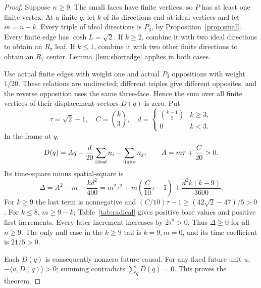 \documentclass[11pt]{article}
\theoremstyle{definition}\newtheorem{definition}[theorem]{Definition}
\theoremstyle{remark}\newtheorem{remark}[theorem]{Remark}
\newcommand{\ip}[2]{\langle #1,#2\rangle}
\newcommand{\Pthree}{P_3}
\newcommand{\Rseven}{R_7}
\newcommand{\bin}[2]{\binom{#1}{#2}}
\begin{document}
\begin{proof}
Suppose \(n\ge9\). The small faces have finite vertices, so \(P\)
has at least one finite vertex. At a finite \(q\), let \(k\) of its
directions end at ideal vertices and let \(m=n-k\).
Every triple of ideal directions is \(\Pthree\), by
Proposition~\ref{prop:small}. Every finite edge has
\(\cosh L=\sqrt2\). If \(k\ge2\), combine it with two ideal
directions to obtain an \(\Rseven\) leaf. If \(k\le1\), combine
it with two other finite directions to obtain an \(\Rseven\) center.
Lemma~\ref{lem:shortedge} applies in both cases.

Use actual finite edges with weight one and actual \(\Pthree\)
oppositions with weight \(1/20\). These relations are undirected;
different triples give different opposites, and the reverse opposition
uses the same three-face. Hence the sum over all finite vertices of
their displacement vectors \(D(q)\) is zero. Put
\[
 \tau=\sqrt2-1,\quad C=\bin{k}{3},\quad
 d=\begin{cases}\bin{k-1}{2}&k\ge3,\\0&k<3.\end{cases}
\]
In the frame at \(q\),
\begin{equation}\label{eq:smallD}
 D(q)=Aq-\frac d{20}\sum_{\rm ideal}n_i-\sum_{\rm finite}n_j,
 \qquad A=m\tau+\frac C{20}>0.
\end{equation}
Its time-square minus spatial-square is
\begin{equation}\label{eq:Delta}
 \Delta=A^2-m-\frac{kd^2}{400}
 =m^2\tau^2+m\left(\frac C{10}\tau-1\right)
   +\frac{d^2k(k-9)}{3600}.
\end{equation}
For \(k\ge9\) the last term is nonnegative and
\((C/10)\tau-1\ge(42\sqrt2-47)/5>0\).
For \(k\le8\), \(m\ge9-k\); Table~\ref{tab:radical}
gives positive base values and positive first increments. Every later
increment increases by \(2\tau^2>0\). Thus \(\Delta\ge0\)
for all \(n\ge9\). The only null case in the \(k\ge9\) tail is
\(k=9,m=0\), and its time coefficient is \(21/5>0\).

Each \(D(q)\) is consequently nonzero future causal. For any fixed
future unit \(u\), \(-\ip{u}{D(q)}>0\); summing contradicts
\(\sum_qD(q)=0\). This proves the theorem.
\end{proof}
\end{document}

